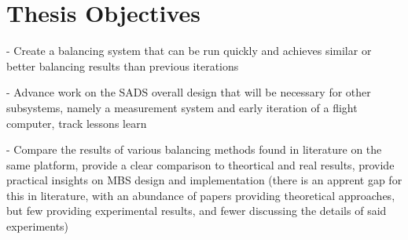 \section{Thesis Objectives}


- Create a balancing system that can be run quickly and achieves similar or better balancing results than previous iterations

- Advance work on the SADS overall design that will be necessary for other subsystems, namely a measurement system and early iteration of a flight computer, track lessons learn

- Compare the results of various balancing methods found in literature on the same platform, provide a clear comparison to theortical and real results, provide practical insights on MBS design and implementation (there is an apprent gap for this in literature, with an abundance of papers providing theoretical approaches, but few providing experimental results, and fewer discussing the details of said experiments)
